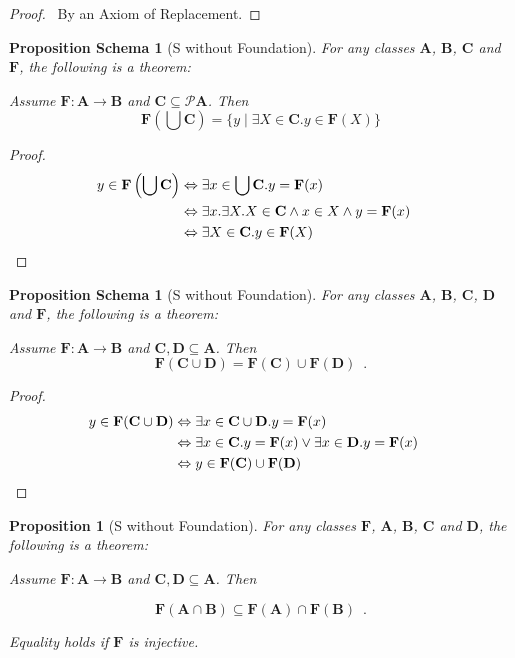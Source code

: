 \documentclass{book}
\let\qed\relax
\newtheorem{prop}[ax]{Proposition}
\newtheorem{props}[ax]{Proposition Schema}
\theoremstyle{definition}
\begin{document}
\begin{proof}
\pf\ By an Axiom of Replacement. \qed
\end{proof}

\begin{props}[S without Foundation]
\label{prop:imgunion}
For any classes $\mathbf{A}$, $\mathbf{B}$, $\mathbf{C}$ and $\mathbf{F}$, the following is a theorem:

Assume $\mathbf{F} : \mathbf{A} \rightarrow \mathbf{B}$ and $\mathbf{C} \subseteq \mathcal{P} \mathbf{A}$. Then
\[ \mathbf{F} \left( \bigcup \mathbf{C} \right) = \{ y \mid \exists X \in \mathbf{C}. y \in \mathbf{F}(X) \} \]
\end{props}

\begin{proof}
\pf
\begin{align*}
	y \in \mathbf{F} \left( \bigcup \mathbf{C} \right) & \Leftrightarrow \exists x \in \bigcup \mathbf{C}. y = \mathbf{F}(x) \\
	& \Leftrightarrow \exists x. \exists X. X \in \mathbf{C} \wedge x \in X \wedge y = \mathbf{F}(x) \\
	& \Leftrightarrow \exists X \in \mathbf{C}. y \in \mathbf{F}(X) & \qed
\end{align*}
\end{proof}

\begin{props}[S without Foundation]
For any classes $\mathbf{A}$, $\mathbf{B}$, $\mathbf{C}$, $\mathbf{D}$ and $\mathbf{F}$, the following is a theorem:

Assume $\mathbf{F} : \mathbf{A} \rightarrow \mathbf{B}$ and $\mathbf{C}, \mathbf{D} \subseteq \mathbf{A}$. Then
\[ \mathbf{F}(\mathbf{C} \cup \mathbf{D}) = \mathbf{F}(\mathbf{C}) \cup \mathbf{F}(\mathbf{D}) \enspace . \]
\end{props}

\begin{proof}
\pf
\begin{align*}
	y \in \mathbf{F}(\mathbf{C} \cup \mathbf{D})
	& \Leftrightarrow \exists x \in \mathbf{C} \cup \mathbf{D}. y = \mathbf{F}(x) \\
	& \Leftrightarrow \exists x \in \mathbf{C}. y = \mathbf{F}(x) \vee \exists x \in \mathbf{D}. y = \mathbf{F}(x) \\
	& \Leftrightarrow y \in \mathbf{F}(\mathbf{C}) \cup \mathbf{F}(\mathbf{D}) & \qed
\end{align*}
\end{proof}

\begin{prop}[S without Foundation]
For any classes $\mathbf{F}$, $\mathbf{A}$, $\mathbf{B}$, $\mathbf{C}$ and $\mathbf{D}$, the following is a theorem:

Assume $\mathbf{F} : \mathbf{A} \rightarrow \mathbf{B}$ and $\mathbf{C}, \mathbf{D} \subseteq \mathbf{A}$. Then

\[ \mathbf{F}(\mathbf{A} \cap \mathbf{B}) \subseteq \mathbf{F}(\mathbf{A}) \cap \mathbf{F}(\mathbf{B}) \enspace . \]

Equality holds if $\mathbf{F}$ is injective.
\end{prop}
\end{document}
